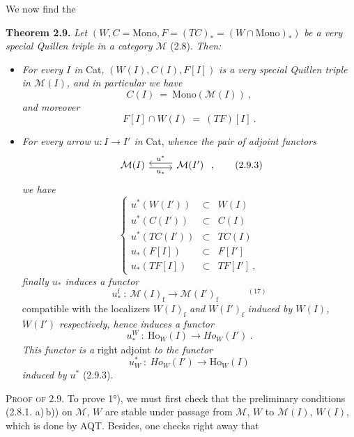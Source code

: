 \documentclass[11pt]{article}
\newcommand{\printedpage}[1]{\marginpar{\footnotesize p.~#1}}
\newcommand{\msp}[1]{\marginpar{\footnotesize [#1]}}
\newcommand{\Ho}{\mathrm{Ho}}
\newcommand{\Mono}{\mathrm{Mono}}
\begin{document}
We now find the

\textbf{Theorem 2.9.} \textit{Let} $(W, C = \Mono, F = (TC)_* = (W\cap\Mono)_*)$ \textit{be a very special Quillen triple in a category $\mathcal{M}$} (2.8). \textit{Then:}
\begin{itemize}[leftmargin=2.5em]
\item[1°)] \textit{For every $I$ in} Cat, $(W(I),C(I),F[I])$ \textit{is a very special Quillen triple in $\mathcal{M}(I)$, and in particular we have}
\[ C(I) \ = \ \Mono(\mathcal{M}(I))\ , \tag*{(2.9.1)} \]
\textit{and moreover}
\[ F[I]\cap W(I) \ = \ (TF)[I]\ . \tag*{(2.9.2)} \]
\item[2°)] \textit{For every arrow $u : I \longrightarrow I'$ in} Cat, \textit{whence the pair of adjoint functors}
\[ \begin{tikzcd}
\mathcal{M}(I) \arrow[r, shift right, "u_*"'] & \mathcal{M}(I') \arrow[l, shift right, "u^*"']
\end{tikzcd}\ , \tag*{(2.9.3)} \]
\textit{we have}
\[ \left\{ \begin{array}{rcl}
u^*(W(I')) & \subset & W(I)\\
u^*(C(I')) & \subset & C(I)\\
u^*(TC(I')) & \subset & TC(I)\\
u_*(F[I]) & \subset & F[I']\\
u_*(TF[I]) & \subset & TF[I']\ ,
\end{array}\right. \tag*{(2.9.4)} \]
\textit{finally $u_*$ induces a functor}
\printedpage{18}
\msp{page 29}
\[ u_*^{\mathrm{f}} \ :\ \mathcal{M}(I)_{\mathrm{f}} \longrightarrow \mathcal{M}(I')_{\mathrm{f}} \qquad\quad ^{(17)} \tag*{(2.9.5)} \]
compatible with the localizers $W(I)_{\mathrm{f}}$ \textit{and} $W(I')_{\mathrm{f}}$ \textit{induced by $W(I)$, $W(I')$ respectively, hence induces a functor}
\[ u_*^W \ :\ \Ho_W(I) \longrightarrow \mathit{Ho}_W(I')\ . \tag*{(2.9.6)} \] %
\textit{This functor is a} right adjoint \textit{to the functor}
\[ u_W^* \ :\ \mathit{Ho}_W(I') \longrightarrow \Ho_W(I) \tag*{(2.9.7)} \] %
\textit{induced by $u^*$} (2.9.3).
\end{itemize}
\textsc{Proof of 2.9.} To prove 1°), we must first check that the preliminary conditions (2.8.1. a)\,b)) on $\mathcal{M}$, $W$ are stable under passage from $\mathcal{M}$, $W$ to $\mathcal{M}(I)$, $W(I)$, which is done by AQT. Besides, one checks right away that
\end{document}
